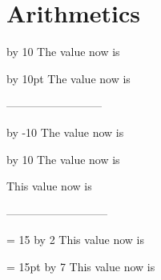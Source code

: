 \documentclass{article}
\begin{document}
 \section{Arithmetics}

 \newcount\tempa
 \advance\tempa by 10
 The value now is \the\tempa
 
 \newdimen\variable
 \variable=12pt
 \advance\variable by 10pt
 The value now is \the\variable
 
 --------------------------
 
 \multiply\tempa by -10
 The value now is \the\tempa
 
 \multiply\variable by 10
 The value now is \the\variable
 
 \variable
 This value now is \the\variable
 
 ---------------------------
 
 \tempa = 15
 \divide\tempa by 2
 This value now is \the\tempa
 
 \variable = 15pt
 \divide\variable by 7
 This value now is \the\variable
\end{document}
